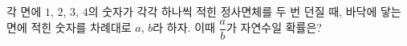 각 면에 $1$, $2$, $3$, $4$의 숫자가 각각 하나씩 적힌 정사면체를 두 번 던질 때, 바닥에 닿는 면에 적힌 숫자를 차례대로 $a$, $b$라 하자. 이때 $\dfrac{a}{b}$가 자연수일 확률은?
